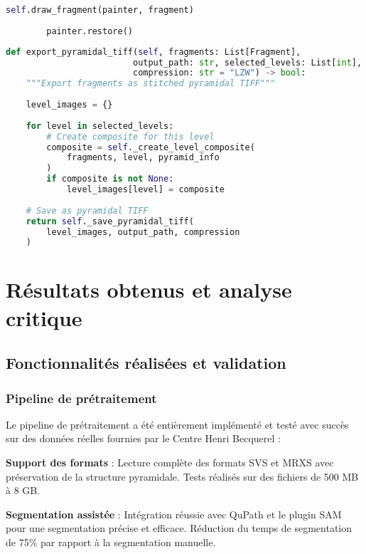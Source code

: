 \documentclass[12pt,a4paper]{report}
\begin{document}
\begin{}
\begin{}
\begin{}
\begin{}
\begin{lstlisting}[language=Python, caption=Canvas Widget - Rendu haute performance]
            self.draw_fragment(painter, fragment)
        
        painter.restore()
\end{lstlisting}

\begin{lstlisting}[language=Python, caption=Exportation pyramidale - Gestion multi-niveaux]
def export_pyramidal_tiff(self, fragments: List[Fragment], 
                         output_path: str, selected_levels: List[int],
                         compression: str = "LZW") -> bool:
    """Export fragments as stitched pyramidal TIFF"""
    
    level_images = {}
    
    for level in selected_levels:
        # Create composite for this level
        composite = self._create_level_composite(
            fragments, level, pyramid_info
        )
        if composite is not None:
            level_images[level] = composite
    
    # Save as pyramidal TIFF
    return self._save_pyramidal_tiff(
        level_images, output_path, compression
    )
\end{lstlisting}

\section{Résultats obtenus et analyse critique}

\clearpage

\vspace{0.5em}

\subsection{Fonctionnalités réalisées et validation}

\subsubsection{Pipeline de prétraitement}

Le pipeline de prétraitement a été entièrement implémenté et testé avec succès sur des données réelles fournies par le Centre Henri Becquerel :

\textbf{Support des formats} : Lecture complète des formats SVS et MRXS avec préservation de la structure pyramidale. Tests réalisés sur des fichiers de 500 MB à 8 GB.

\textbf{Segmentation assistée} : Intégration réussie avec QuPath et le plugin SAM pour une segmentation précise et efficace. Réduction du temps de segmentation de 75\% par rapport à la segmentation manuelle.


\end{}
\end{}
\end{}
\end{}
\end{document}
